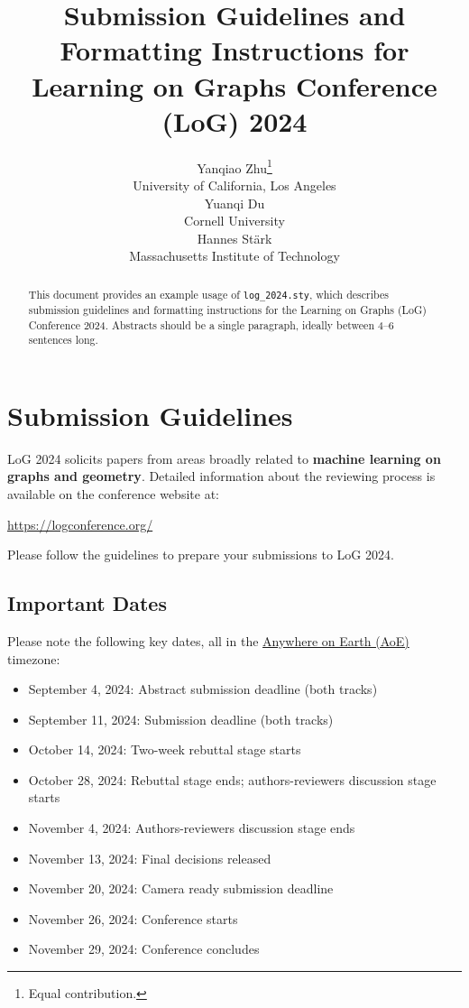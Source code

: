 \documentclass{article}
\title[Submission Guidelines and Formatting Instructions for LoG Conference 2024]{Submission Guidelines and Formatting Instructions for Learning on Graphs Conference (LoG) 2024}
\author[Y. Zhu et al.]{%
Yanqiao Zhu\thanks{Equal contribution.}\\
University of California, Los Angeles\\
\email{yzhu@cs.ucla.edu}\And
Yuanqi Du\footnotemark[1]\\
Cornell University\\
\email{yd392@cornell.edu}\And
Hannes Stärk\\
Massachusetts Institute of Technology\\
\email{hstark@mit.edu}
}
\begin{document}
\maketitle

\begin{abstract}
This document provides an example usage of \verb+log_2024.sty+, which describes submission guidelines and formatting instructions for the Learning on Graphs (LoG) Conference 2024.
Abstracts should be a single paragraph, ideally between 4--6 sentences long.
\end{abstract}

\section{Submission Guidelines}

LoG 2024 solicits papers from areas broadly related to \textbf{machine learning on graphs and geometry}.
Detailed information about the reviewing process is available on the conference website at:
\begin{center}
	\url{https://logconference.org/}
\end{center}
Please follow the guidelines to prepare your submissions to LoG 2024.

\subsection{Important Dates}

Please note the following key dates, all in the \href{https://www.timeanddate.com/time/zones/aoe}{Anywhere on Earth (AoE)} timezone:
\begin{itemize}
	\item September 4, 2024: Abstract submission deadline (both tracks)
	\item September 11, 2024: Submission deadline (both tracks)
	\item October 14, 2024: Two-week rebuttal stage starts
	\item October 28, 2024: Rebuttal stage ends; authors-reviewers discussion stage starts
	\item November 4, 2024: Authors-reviewers discussion stage ends
	\item November 13, 2024: Final decisions released
	\item November 20, 2024: Camera ready submission deadline
	\item November 26, 2024: Conference starts
	\item November 29, 2024: Conference concludes
\end{itemize}
\end{document}
